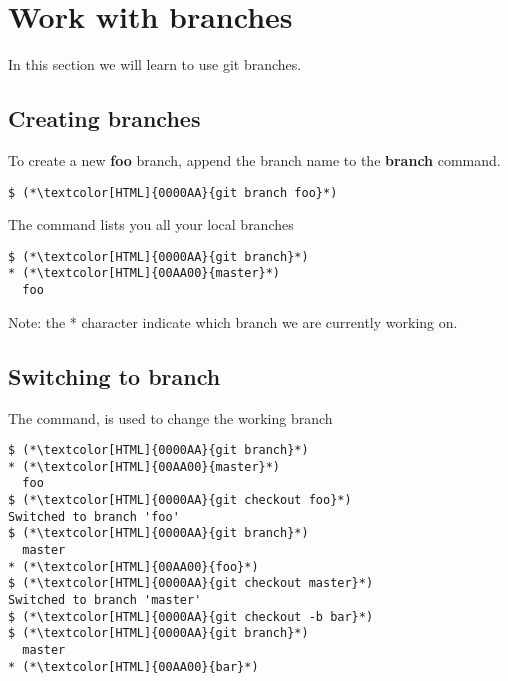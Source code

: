 \section{Work with branches}
\begin{frame}[fragile]
    \slidetitle
In this section we will learn to use git branches.

\end{frame}

\subsection{Creating branches}
\begin{frame}[fragile]
    \subslidetitle

To create a new \textbf{foo} branch, append the branch name to the \textbf{branch} command.
\begin{lstlisting}
$ (*\textcolor[HTML]{0000AA}{git branch foo}*)
\end{lstlisting}

The  command lists you all your local branches
\begin{lstlisting}
$ (*\textcolor[HTML]{0000AA}{git branch}*)
* (*\textcolor[HTML]{00AA00}{master}*)
  foo
\end{lstlisting}

Note: the * character indicate which branch we are currently working on.
\end{frame}

\subsection{Switching to branch}
\begin{frame}[fragile]
    \subslidetitle
The  command, is used to change the working branch
\begin{lstlisting}
$ (*\textcolor[HTML]{0000AA}{git branch}*)
* (*\textcolor[HTML]{00AA00}{master}*)
  foo
$ (*\textcolor[HTML]{0000AA}{git checkout foo}*)
Switched to branch 'foo'
$ (*\textcolor[HTML]{0000AA}{git branch}*)
  master
* (*\textcolor[HTML]{00AA00}{foo}*)
$ (*\textcolor[HTML]{0000AA}{git checkout master}*)
Switched to branch 'master'
$ (*\textcolor[HTML]{0000AA}{git checkout -b bar}*)
$ (*\textcolor[HTML]{0000AA}{git branch}*)
  master
* (*\textcolor[HTML]{00AA00}{bar}*)
\end{lstlisting}
\end{frame}

